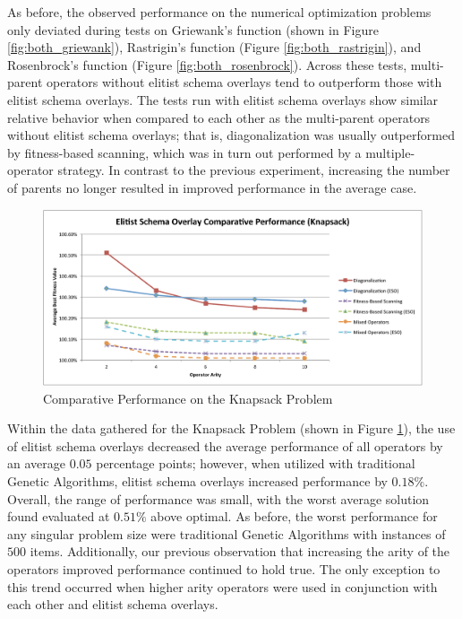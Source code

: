 As before, the observed performance on the numerical optimization problems only deviated during tests on Griewank's function (shown in Figure \ref{fig:both_griewank}), Rastrigin's function (Figure \ref{fig:both_rastrigin}), and Rosenbrock's function (Figure \ref{fig:both_rosenbrock}). Across these tests, multi-parent operators without elitist schema overlays tend to outperform those with elitist schema overlays. The tests run with elitist schema overlays show similar relative behavior when compared to each other as the multi-parent operators without elitist schema overlays; that is, diagonalization was usually outperformed by fitness-based scanning, which was in turn out performed by a multiple-operator strategy. In contrast to the previous experiment, increasing the number of parents no longer resulted in improved performance in the average case.

\begin{figure}[htbp!]
\centering
\includegraphics[scale=0.55]{charts/Both_Knapsack.pdf}
\caption{Comparative Performance on the Knapsack Problem}
\label{fig:both_knapsack}
\end{figure}

Within the data gathered for the Knapsack Problem (shown in Figure \ref{fig:both_knapsack}), the use of elitist schema overlays decreased the average performance of all operators by an average $0.05$ percentage points; however, when utilized with traditional Genetic Algorithms, elitist schema overlays increased performance by $0.18\%$. Overall, the range of performance was small, with the worst average solution found evaluated at $0.51\%$ above optimal. As before, the worst performance for any singular problem size were traditional Genetic Algorithms with instances of $500$ items. Additionally, our previous observation that increasing the arity of the operators improved performance continued to hold true. The only exception to this trend occurred when higher arity operators were used in conjunction with each other and elitist schema overlays.

